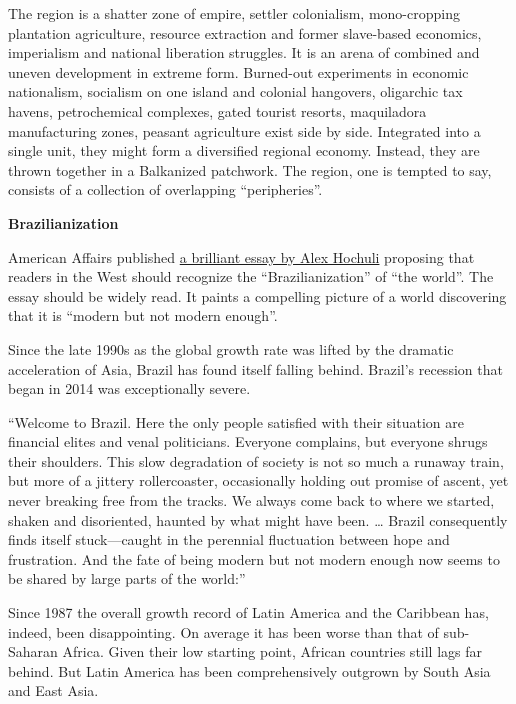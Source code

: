 \documentclass[
]{book}
\begin{document}
The region is a shatter zone of empire, settler colonialism, mono-cropping plantation agriculture, resource extraction and former slave-based economics, imperialism and national liberation struggles. It is an arena of combined and uneven development in extreme form. Burned-out experiments in economic nationalism, socialism on one island and colonial hangovers, oligarchic tax havens, petrochemical complexes, gated tourist resorts, maquiladora manufacturing zones, peasant agriculture exist side by side. Integrated into a single unit, they might form a diversified regional economy. Instead, they are thrown together in a Balkanized patchwork. The region, one is tempted to say, consists of a collection of overlapping ``peripheries''.

\textbf{Brazilianization}

American Affairs published \href{https://americanaffairsjournal.org/2021/05/the-brazilianization-of-the-world/}{a brilliant essay by Alex Hochuli} proposing that readers in the West should recognize the ``Brazilianization'' of ``the world''. The essay should be widely read. It paints a compelling picture of a world discovering that it is ``modern but not modern enough''.

Since the late 1990s as the global growth rate was lifted by the dramatic acceleration of Asia, Brazil has found itself falling behind. Brazil's recession that began in 2014 was exceptionally severe.

``Welcome to Brazil. Here the only people satisfied with their situation are financial elites and venal politicians. Everyone complains, but everyone shrugs their shoulders. This slow degradation of society is not so much a runaway train, but more of a jittery rollercoaster, occasionally holding out promise of ascent, yet never break­ing free from the tracks. We always come back to where we started, shaken and disoriented, haunted by what might have been. \ldots{} Brazil consequently finds itself stuck---caught in the perennial fluctuation between hope and frustration. And the fate of being modern but not modern enough now seems to be shared by large parts of the world:''

Since 1987 the overall growth record of Latin America and the Caribbean has, indeed, been disappointing. On average it has been worse than that of sub-Saharan Africa. Given their low starting point, African countries still lags far behind. But Latin America has been comprehensively outgrown by South Asia and East Asia.
\end{document}

